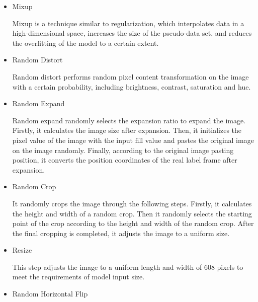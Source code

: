 \documentclass[sensors,article,submit,moreauthors,pdftex]{Definitions/mdpi}
\begin{document}
\begin{paracol}{2}
\begin{itemize}
\begin{itemize}
\item{Mixup}

Mixup is a technique similar to regularization, which interpolates data in a high-dimensional space, increases the size of the pseudo-data set, and reduces the overfitting of the model to a certain extent. 
\end{itemize}


\begin{itemize}
\item{Random Distort}

Random distort performs random pixel content transformation on the image with a certain probability, including brightness, contrast, saturation and hue.

\end{itemize}

\begin{itemize}
\item{Random Expand}

Random expand randomly selects the expansion ratio to expand the image. Firstly, it calculates the image size after expansion. Then, it initializes the pixel value of the image with the input fill value and pastes the original image on the image randomly. Finally, according to the original image pasting position, it converts the position coordinates of the real label frame after expansion.

\end{itemize}


\begin{itemize}
\item{Random Crop}

 It randomly crops the image through the following steps. Firstly, it calculates the height and width of a random crop. Then it randomly selects the starting point of the crop according to the height and width of the random crop. After the final cropping is completed, it adjusts the image to a uniform size.

\end{itemize}


\begin{itemize}
\item{Resize}

This step adjusts the image to a uniform length and width of 608 pixels to meet the requirements of model input size.

\end{itemize}


\begin{itemize}
\item{Random Horizontal Flip}


\end{itemize}
\end{itemize}
\end{paracol}
\end{document}
